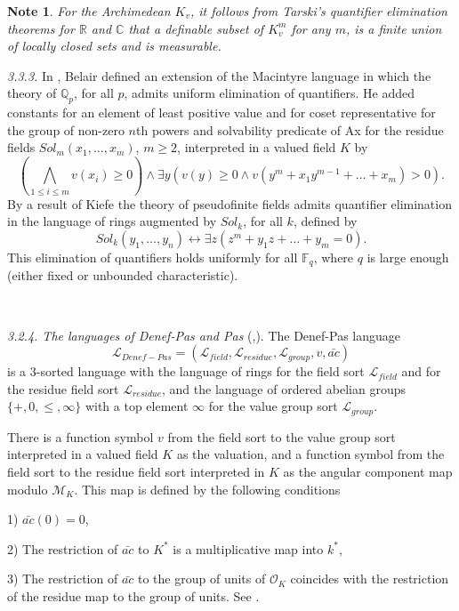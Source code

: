 \documentclass[12pt]{amsart}
\def\R{\mathbb{R}}
\def\C{\mathbb{C}}
\def\F{\mathbb{F}}
\def\cL{\mathcal{L}}
\def\C{\mathbb{C}}
\def\R{\mathbb{R}}
\def\Q{\mathbb{Q}}
\def\F{\mathbb{F}}
\def\cL{\mathcal{L}}
\def\cM{\mathcal M}
\numberwithin{equation}{section}
\newtheorem{note}{Note}[section]
\begin{document}
\begin{note} For the Archimedean $K_v$, it follows from Tarski's quantifier elimination theorems for $\R$ and $\C$ that a definable subset of $K_v^m$ for any $m$, is a finite union of locally closed sets and is measurable.\end{note} 

\medskip

{\it 3.3.3.} In \cite{Belair}, Belair defined an extension of the Macintyre language in which the theory of $\Q_p$, for all $p$, admits uniform elimination of quantifiers. He added constants for an element of least positive value and for coset representative for the group of non-zero $n$th powers and solvability predicate of Ax for the residue fields
$Sol_m(x_1,\dots,x_m)$, $m\geq 2$, interpreted in a valued field $K$ by
$$(\bigwedge_{1\leq i\leq m} v(x_i)\geq 0) \wedge \exists y (v(y)\geq 0 \wedge v(y^m+x_1y^{m-1}+\dots+x_m)>0).$$
By a result of Kiefe \cite{kiefe} the theory of pseudofinite fields admits quantifier elimination in the language of rings augmented by $Sol_k$, for all $k$, defined by
$$Sol_k(y_1,\dots,y_n) \leftrightarrow \exists z (z^m+y_1z+\dots+y_m=0).$$ 
This elimination of quantifiers holds uniformly for all $\F_q$, where $q$ is large enough 
(either fixed or unbounded characteristic).

\

{\it 3.2.4. The languages of Denef-Pas and Pas} (\cite{pas},\cite{pas2}). The Denef-Pas language 
\[
\cL_{Denef-Pas}=(\cL_{field},\cL_{residue},\cL_{group},v,\bar{ac})
\]
is a 3-sorted language with the language of rings for the field sort $\cL_{field}$ and for the residue field sort $\cL_{residue}$, and the language of ordered abelian groups $\{+,0,\leq,\infty\}$ with a top element $\infty$ for the value group sort $\cL_{group}$. 

There is a function symbol $v$ from the field sort to the value group sort interpreted in a valued field $K$ as the valuation, and a function symbol from the field sort to the residue field sort interpreted in $K$ as the angular component map modulo $\cM_K$. This map is defined by the following conditions 

1) $\bar{ac}(0)=0$, 

2) The restriction of $\bar{ac}$ to $K^*$ is a multiplicative map into $k^*$, 

3) The restriction of $\bar{ac}$ to the group of units of $\mathcal{O}_K$ coincides with the restriction of the residue map to the group of units. See \cite{pas}.
\end{document}
